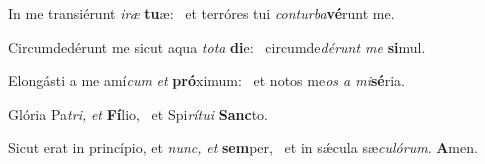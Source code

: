 \item In me transiérunt \textit{iræ} \textbf{tu}æ:~\psstar{} et terróres tui \textit{conturba}\textbf{vé}runt me.
\item Circumdedérunt me sicut aqua \textit{tota} \textbf{di}e:~\psstar{} circumde\textit{dérunt me} \textbf{si}mul.
\item Elongásti a me amí\textit{cum} \textit{et} \textbf{pró}ximum:~\psstar{} et notos me\textit{os a mi}\textbf{sé}ria.
\item Glória Pa\textit{tri,} \textit{et} \textbf{Fí}lio,~\psstar{} et Spi\textit{rítui} \textbf{Sanc}to.
\item Sicut erat in princípio, et \textit{nunc,} \textit{et} \textbf{sem}per,~\psstar{} et in sǽcula sæ\textit{culórum}. \textbf{A}men.
